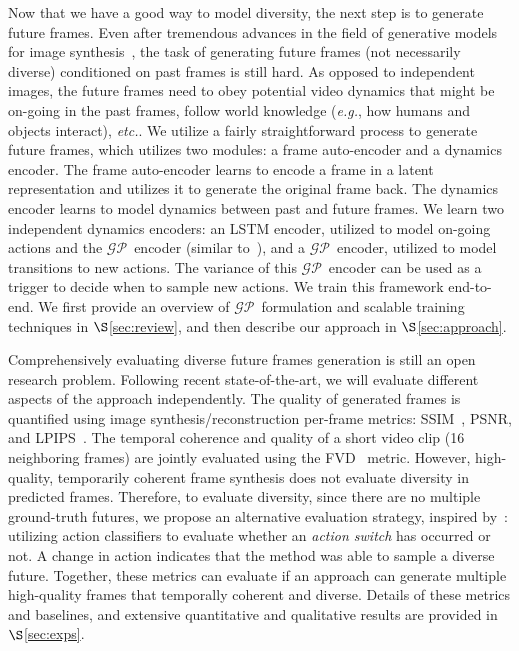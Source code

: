 \documentclass{article} \usepackage{iclr2021_conference,times}
\newcommand{\GP}{$\mathcal{GP}$}
\def\eg{\emph{e.g.}}
\def\etc{\emph{etc.}}
\begin{document}
Now that we have a good way to model diversity, the next step is to generate future frames. Even after tremendous advances in the field of generative models for image synthesis~\citep{denton2018stochastic,babaeizadeh2017stochastic,lee2018savp,Vondrick2017GeneratingTF,Lu2017FlexibleSN,Vondrick2016GeneratingVW,Saito_2017,Tulyakov_2018,Hu_2019_ICCV}, the task of generating future frames (not necessarily diverse) conditioned on past frames is still hard. As opposed to independent images, the future frames need to obey potential video dynamics that might be on-going in the past frames, follow world knowledge (\eg, how humans and objects interact), \etc.
We utilize a fairly straightforward process to generate future frames, which utilizes two modules: a frame auto-encoder and a dynamics encoder. The frame auto-encoder learns to encode a frame in a latent representation and utilizes it to generate the original frame back. The dynamics encoder learns to model dynamics between past and future frames. We learn two independent dynamics encoders: an LSTM encoder, utilized to model on-going actions and the \GP\ encoder (similar to~\citep{Srivastava:2015:ULV:3045118.3045209}), and a \GP\ encoder, utilized to model transitions to new actions. The variance of this \GP\ encoder can be used as a trigger to decide when to sample new actions. We train this framework end-to-end. We first provide an overview of \GP\ formulation and scalable training techniques in $\S$\ref{sec:review}, and then describe our approach in $\S$\ref{sec:approach}.

Comprehensively evaluating diverse future frames generation is still an open research problem. Following recent state-of-the-art, we will evaluate different aspects of the approach independently. The quality of generated frames is quantified using image synthesis/reconstruction per-frame metrics: SSIM~\citep{wang2018eidetic,5109651}, PSNR, and LPIPS~\citep{Zhang_2018,dosovitskiy2016generating,Johnson_2016}. The temporal coherence and quality of a short video clip (16 neighboring frames) are jointly evaluated using the FVD~\citep{unterthiner2018accurate} metric. However, high-quality, temporarily coherent frame synthesis does not evaluate diversity in predicted frames. Therefore, to evaluate diversity, since there are no multiple ground-truth futures, we propose an alternative evaluation strategy, inspired by~\citep{villegas2017learning}: utilizing action classifiers to evaluate whether an \emph{action switch} has occurred or not. A change in action indicates that the method was able to sample a diverse future. Together, these metrics can evaluate if an approach can generate multiple high-quality frames that temporally coherent and diverse. Details of these metrics and baselines, and extensive quantitative and qualitative results are provided in $\S$\ref{sec:exps}.
\end{document}
